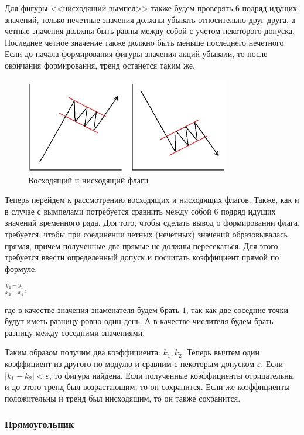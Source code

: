 \documentclass[bachelor, och, coursework]{SCWorks}
\begin{document}
    Для фигуры <<нисходящий вымпел>> также будем проверять 6 подряд идущих
    значений, только нечетные значения должны убывать относительно друг друга, а
    четные значения должны быть равны между собой с учетом некоторого допуска.
    Последнее четное значение также должно быть меньше последнего нечетного.
    Если до начала формирования фигуры значения акций убывали, то после
    окончания формирования, тренд останется таким же.

    \begin{figure}[H]
        \centering
        \includegraphics[width=0.8\textwidth]{pic/flags.jpg}
        \caption{Восходящий и нисходящий флаги}
    \end{figure}

    Теперь перейдем к рассмотрению восходящих и нисходящих флагов. Также, как и
    в случае с вымпелами потребуется сравнить между собой 6 подряд идущих
    значений временного ряда. Для того, чтобы сделать вывод о формировании
    флага, требуется, чтобы при соединении четных (нечетных) значений
    образовывалась прямая, причем полученные две прямые не должны пересекаться.
    Для этого требуется ввести определенный допуск и посчитать коэффициент
    прямой по формуле:
    \begin{center}
        $\frac{y_2 - y_1}{x_2 - x_1}$,
    \end{center}
    где в качестве значения знаменателя будем брать $1$, так как две соседние
    точки будут иметь разницу ровно один день. А в качестве числителя будем
    брать разницу между соседними значениями.
    
    Таким образом получим два коэффициента: $k_1, k_2$. Теперь вычтем один
    коэффициент из другого по модулю и сравним с некоторым допуском
    $\varepsilon$. Если $|k_1 - k_2| < \varepsilon$, то фигура найдена. Если
    полученные коэффициенты отрицательны и до этого тренд был возрастающим, то
    он сохранится. Если же коэффициенты положительны и тренд был нисходящим, то
    он также сохранится.

    \subsubsection{Прямоугольник}
\end{document}
